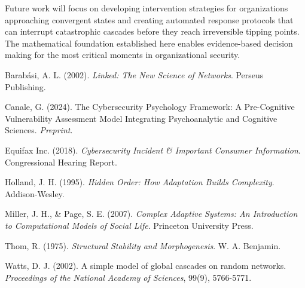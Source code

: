 \documentclass[11pt,a4paper]{article}
\begin{document}
Future work will focus on developing intervention strategies for organizations approaching convergent states and creating automated response protocols that can interrupt catastrophic cascades before they reach irreversible tipping points. The mathematical foundation established here enables evidence-based decision making for the most critical moments in organizational security.

\begin{thebibliography}{9}

Barabási, A. L. (2002). \textit{Linked: The New Science of Networks}. Perseus Publishing.

Canale, G. (2024). The Cybersecurity Psychology Framework: A Pre-Cognitive Vulnerability Assessment Model Integrating Psychoanalytic and Cognitive Sciences. \textit{Preprint}.

Equifax Inc. (2018). \textit{Cybersecurity Incident \& Important Consumer Information}. Congressional Hearing Report.

Holland, J. H. (1995). \textit{Hidden Order: How Adaptation Builds Complexity}. Addison-Wesley.

Miller, J. H., \& Page, S. E. (2007). \textit{Complex Adaptive Systems: An Introduction to Computational Models of Social Life}. Princeton University Press.

Thom, R. (1975). \textit{Structural Stability and Morphogenesis}. W. A. Benjamin.

Watts, D. J. (2002). A simple model of global cascades on random networks. \textit{Proceedings of the National Academy of Sciences}, 99(9), 5766-5771.

\end{thebibliography}
\end{document}
